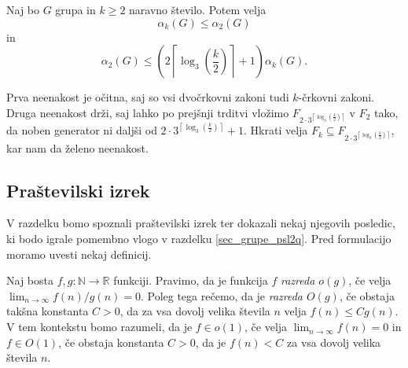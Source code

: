\begin{posledica}\label{psl_veccrkovni_zakoni_meje}
Naj bo $G$ grupa in $k \ge 2$ naravno število. Potem velja \begin{equation*}
     \alpha_k(G) \le  \alpha_2(G) 
\end{equation*}  
in \begin{equation*}
\alpha_2(G) \le \left( {2 \left\lceil \log_3 \left(\frac{k}{2} \right) \right\rceil + 1  } \right) \alpha_k(G).
\end{equation*}  
\end{posledica}
\begin{dokaz}
    Prva neenakost je očitna, saj so vsi dvočrkovni zakoni tudi $k$-črkovni zakoni. Druga neenakost drži, saj lahko po prejšnji trditvi vložimo $F_{2 \cdot  3^{\left\lceil \log_3 \left(\frac{k}{2} \right) \right\rceil}}$ v $F_2$
    tako, da noben generator ni daljši od ${2 \cdot  3^{\left\lceil \log_3 \left(\frac{k}{2} \right) \right\rceil } + 1 }$. Hkrati velja $F_k \subseteq F_{2 \cdot  3^{\left\lceil \log_3 \left(\frac{k}{2} \right)  \right\rceil}}$, kar nam da želeno neenakost.
\end{dokaz}

\subsection{Praštevilski izrek}

V razdelku bomo spoznali praštevilski izrek ter dokazali nekaj njegovih posledic, ki bodo igrale pomembno vlogo v razdelku \ref{sec_grupe_psl2q}. Pred formulacijo moramo uvesti nekaj definicij.

\begin{definicija}
\label{def_o1_O1}
Naj bosta $f, g : \mathbb{N} \to  \mathbb{R}$ funkciji. Pravimo, da je funkcija $f$ \emph{razreda $o(g)$}, če velja $\lim_{n \to \infty} f(n) / g(n) = 0$.
Poleg tega rečemo, da je \emph{razreda $O(g)$}, če obstaja takšna konstanta $C > 0$, da za vsa dovolj velika števila $n$ velja $f(n) \le C g(n)$.
V tem kontekstu bomo razumeli, da je $f \in o(1)$, če velja $\lim_{n \to \infty} f(n) = 0$ in $f \in O(1)$, če obstaja konstanta $C >0$, da je $f(n) < C$ za vsa dovolj velika števila $n$.
\end{definicija}

